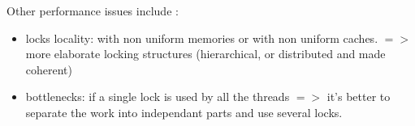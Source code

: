 \documentclass[a4paper,10pt]{article}
\begin{document}
Other performance issues include :

\begin{itemize}
  \item locks locality: with non uniform memories or with non uniform caches. $=>$ more elaborate locking structures (hierarchical, or distributed and made coherent)
  \item bottlenecks: if a single lock is used by all the threads $=>$ it's better to separate the work into independant parts and use several locks.
\end{itemize}
\end{document}
